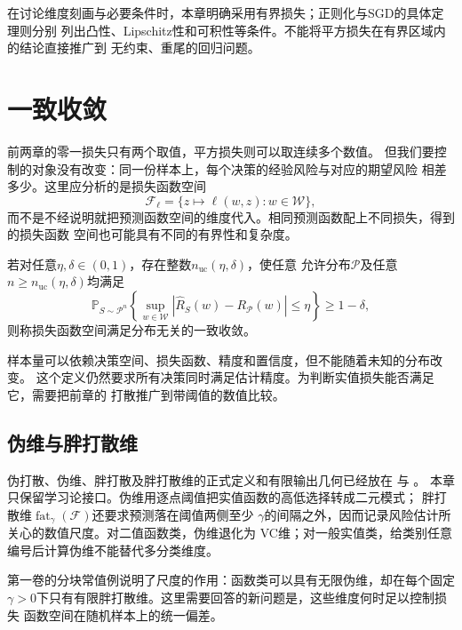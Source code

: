 在讨论维度刻画与必要条件时，本章明确采用有界损失；正则化与SGD的具体定理则分别
列出凸性、Lipschitz性和可积性等条件。不能将平方损失在有界区域内的结论直接推广到
无约束、重尾的回归问题。

\section{一致收敛}
\label{sec:real-valued-classes}

前两章的零一损失只有两个取值，平方损失则可以取连续多个数值。
但我们要控制的对象没有改变：同一份样本上，每个决策的经验风险与对应的期望风险
相差多少。这里应分析的是损失函数空间
\[
 \mathcal F_\ell=\{z\mapsto\ell(w,z):w\in\mathcal W\},
\]
而不是不经说明就把预测函数空间的维度代入。相同预测函数配上不同损失，得到的损失函数
空间也可能具有不同的有界性和复杂度。

\begin{definition}[一般学习问题的一致收敛]
\label{def:general-uniform-convergence}
若对任意$\eta,\delta\in(0,1)$，存在整数$n_{\mathrm{uc}}(\eta,\delta)$，使任意
允许分布$\mathcal P$及任意$n\geq n_{\mathrm{uc}}(\eta,\delta)$均满足
\[
 \mathbb P_{S\sim\mathcal P^n}\!\left\{
 \sup_{w\in\mathcal W}|\hat R_S(w)-R_{\mathcal P}(w)|\leq\eta
 \right\}\geq1-\delta,
\]
则称损失函数空间满足分布无关的一致收敛。
\end{definition}

样本量可以依赖决策空间、损失函数、精度和置信度，但不能随着未知的分布改变。
这个定义仍然要求所有决策同时满足估计精度。为判断实值损失能否满足它，需要把前章的
打散推广到带阈值的数值比较。

\subsection{伪维与胖打散维}

伪打散、伪维、胖打散及胖打散维的正式定义和有限输出几何已经放在
与
。
本章只保留学习论接口。伪维用逐点阈值把实值函数的高低选择转成二元模式；
胖打散维$\operatorname{fat}_\gamma(\mathcal F)$还要求预测落在阈值两侧至少
$\gamma$的间隔之外，因而记录风险估计所关心的数值尺度。对二值函数类，伪维退化为
VC维；对一般实值类，给类别任意编号后计算伪维不能替代多分类维度。

第一卷的分块常值例说明了尺度的作用：函数类可以具有无限伪维，却在每个固定
$\gamma>0$下只有有限胖打散维。这里需要回答的新问题是，这些维度何时足以控制损失
函数空间在随机样本上的统一偏差。

